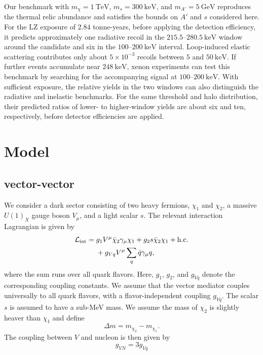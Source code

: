 \documentclass[prd,showpacs,preprintnumbers,amsmath,amssymb,twocolumn,
superscriptaddress,notitlepage]{revtex4-2}
\begin{document}
Our benchmark with $m_\chi=1~\mathrm{TeV}$, $m_s=300~\mathrm{keV}$,
and $m_{A'}=5~\mathrm{GeV}$ reproduces the thermal relic abundance
and satisfies the bounds on $A'$ and $s$ considered here. For the
LZ exposure of $2.84$ tonne-years, before applying the detection
efficiency, it predicts approximately one radiative recoil in the
$215.5$--$280.5~\mathrm{keV}$ window around the candidate and six
in the $100$--$200~\mathrm{keV}$ interval. Loop-induced elastic
scattering contributes only about $5\times10^{-3}$ recoils between
$5$ and $50~\mathrm{keV}$. If further events accumulate near
$248~\mathrm{keV}$, xenon experiments can test this benchmark by
searching for the accompanying signal at $100$--$200~\mathrm{keV}$.
With sufficient exposure, the relative yields in the two windows
can also distinguish the radiative and inelastic benchmarks. For
the same threshold and halo distribution, their predicted ratios
of lower- to higher-window yields are about six and ten,
respectively, before detector efficiencies are applied.



\clearpage

\section{Model}

\subsection{vector-vector}


We consider a dark sector consisting of two heavy fermions,
$\chi_1$ and $\chi_2$, a massive $U(1)_X$ gauge boson $V_\mu$,
and a light scalar $s$. The relevant interaction Lagrangian is
given by
\begin{equation}
	\begin{aligned}
		\mathcal{L}_{\rm int}
		={}&
		g_1 V^\mu \bar{\chi}_2 \gamma_\mu \chi_1
		+ g_2 s \bar{\chi}_2 \chi_1
		+ \mathrm{h.c.}
		\\
		&+g_{Vq} V^\mu \sum_q \bar q \gamma_\mu q,
	\end{aligned}
	\label{eq:Lint_VV}
\end{equation}
where the sum runs over all quark flavors. Here, $g_1$, $g_2$,
and $g_{Vq}$ denote the corresponding coupling constants. We assume
that the vector mediator couples universally to all quark flavors,
with a flavor-independent coupling $g_{Vq}$. The scalar $s$ is
assumed to have a sub-MeV mass. We assume the mass of $\chi_2$ is slightly heaver than $\chi_1$ and define
\begin{equation}
\Delta m = m_{\chi_2} - m_{\chi_1}.
\end{equation}
The coupling between $V$ and nucleon is then given by
\begin{equation}
g_{VN} = 3 g_{Vq}
\end{equation}
\end{document}
